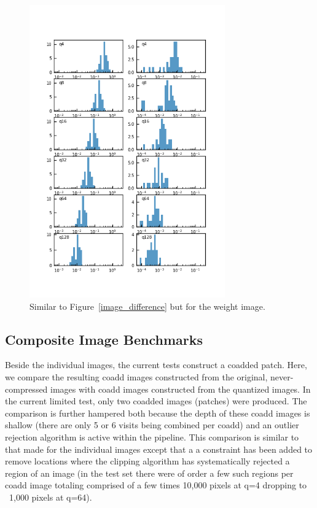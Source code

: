 \begin{figure}
\centering
\includegraphics[width=0.75\textwidth]{figure/compression_metric_v2w.png}
\caption{Similar to Figure~\ref{image_difference} but for the weight image.}
\label{weight_difference}
\end{figure}


\subsection{Composite Image Benchmarks}

Beside the individual images, the current tests construct a coadded patch.  
Here, we compare the resulting coadd images constructed from the original, 
never-compressed images with coadd images constructed from the quantized images.
In the current limited test, only two coadded images (patches) were produced. 
The comparison is further hampered both because the depth of these coadd images 
is shallow (there are only 5 or 6 visits being combined per coadd) and an outlier 
rejection algorithm is active within the pipeline. This comparison is similar to 
that made for the individual images except that a a constraint has been added to 
remove locations where the clipping algorithm has systematically rejected a region 
of an image (in the test set there were of order a few such regions per coadd image
totaling comprised of a few times 10,000 pixels at q=4 dropping to ~1,000 pixels at q=64).

